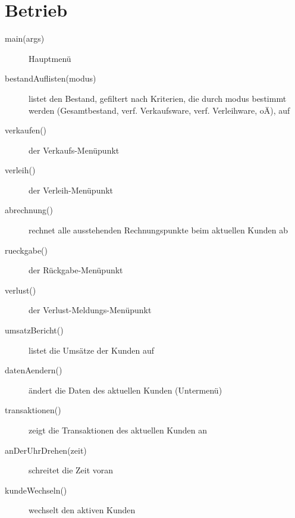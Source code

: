 \documentclass[a4paper,12pt,titlepage]{article}
\begin{document}
\section{Betrieb}
\begin{description}
\item[main(args)]
Hauptmenü
\item[bestandAuflisten(modus)]
listet den Bestand, gefiltert nach Kriterien, die durch modus bestimmt werden (Gesamtbestand, verf. Verkaufsware, verf. Verleihware, oÄ), auf
\item[verkaufen()]
der Verkaufs-Menüpunkt
\item[verleih()]
der Verleih-Menüpunkt
\item[abrechnung()]
rechnet alle ausstehenden Rechnungspunkte beim aktuellen Kunden ab
\item[rueckgabe()]
der Rückgabe-Menüpunkt
\item[verlust()]
der Verlust-Meldungs-Menüpunkt
\item[umsatzBericht()]
listet die Umsätze der Kunden auf
\item[datenAendern()]
ändert die Daten des aktuellen Kunden (Untermenü)
\item[transaktionen()]
zeigt die Transaktionen des aktuellen Kunden an
\item[anDerUhrDrehen(zeit)]
schreitet die Zeit voran
\item[kundeWechseln()]
wechselt den aktiven Kunden
\end{description}
\end{document}

